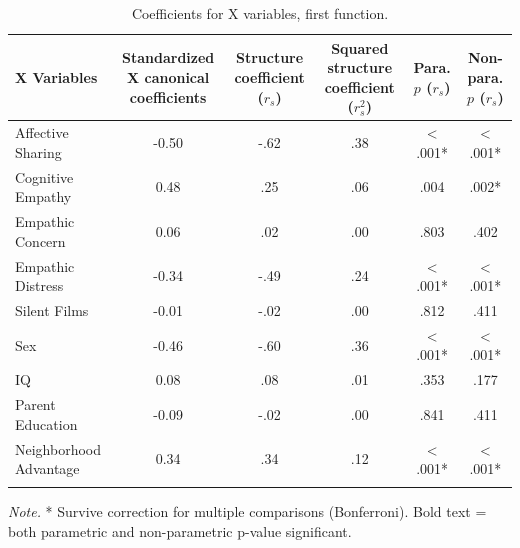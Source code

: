 \documentclass[
  english,
  man,floatsintext]{apa6}
\begin{document}
\begin{table}[tbp]

\begin{center}
\begin{threeparttable}

\caption{\label{tab:coeffxtable}Coefficients for X variables, first function.}

\small{

\begin{tabular}{lccccc}
\toprule
X Variables & Standardized X canonical coefficients & Structure coefficient ($r_{s}$) & Squared structure coefficient ($r^{2}_{s}$) & Para. $p$ ($r_{s}$) & Non-para. $p$ ($r_{s}$)\\
\midrule
Affective Sharing & -0.50 & -.62 & .38 & < .001* & < .001*\\
Cognitive Empathy & 0.48 & .25 & .06 & .004 & .002*\\
Empathic Concern & 0.06 & .02 & .00 & .803 & .402\\
Empathic Distress & -0.34 & -.49 & .24 & < .001* & < .001*\\
Silent Films & -0.01 & -.02 & .00 & .812 & .411\\
Sex & -0.46 & -.60 & .36 & < .001* & < .001*\\
IQ & 0.08 & .08 & .01 & .353 & .177\\
Parent Education & -0.09 & -.02 & .00 & .841 & .411\\
Neighborhood Advantage & 0.34 & .34 & .12 & < .001* & < .001*\\
\bottomrule
\addlinespace
\end{tabular}

}

\begin{tablenotes}[para]
\normalsize{\textit{Note.} * Survive correction for multiple comparisons (Bonferroni). Bold text = both 
          parametric and non-parametric p-value significant.}
\end{tablenotes}

\end{threeparttable}
\end{center}

\end{table}
\end{document}
